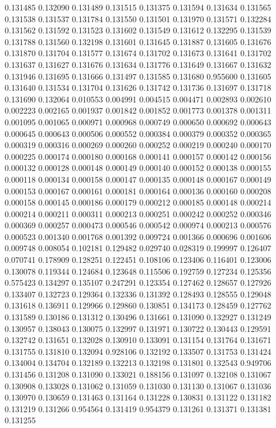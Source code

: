 0.131485
0.132090
0.131489
0.131515
0.131375
0.131594
0.131634
0.131565
0.131538
0.131537
0.131784
0.131550
0.131501
0.131970
0.131571
0.132284
0.131562
0.131592
0.131523
0.131602
0.131549
0.131612
0.132295
0.131539
0.131788
0.131560
0.132198
0.131601
0.131645
0.131887
0.131605
0.131676
0.131870
0.131704
0.131577
0.131674
0.131702
0.131673
0.131641
0.131702
0.131637
0.131627
0.131676
0.131634
0.131776
0.131649
0.131667
0.131632
0.131946
0.131695
0.131666
0.131497
0.131585
0.131680
0.955600
0.131605
0.131640
0.131534
0.131704
0.131626
0.131742
0.131736
0.131697
0.131718
0.131690
0.132064
0.010553
0.004991
0.004515
0.004471
0.002893
0.002610
0.002223
0.002165
0.001937
0.001842
0.001852
0.001773
0.001378
0.001311
0.001095
0.001065
0.000971
0.000968
0.000749
0.000650
0.000692
0.000643
0.000645
0.000643
0.000506
0.000552
0.000384
0.000379
0.000352
0.000365
0.000319
0.000316
0.000269
0.000260
0.000252
0.000219
0.000240
0.000170
0.000225
0.000174
0.000180
0.000168
0.000141
0.000157
0.000142
0.000156
0.000132
0.000128
0.000148
0.000149
0.000140
0.000152
0.000138
0.000155
0.000118
0.000134
0.000158
0.000147
0.000135
0.000148
0.000167
0.000149
0.000153
0.000167
0.000161
0.000181
0.000164
0.000136
0.000160
0.000208
0.000158
0.000145
0.000186
0.000179
0.000212
0.000185
0.000148
0.000214
0.000214
0.000211
0.000311
0.000213
0.000251
0.000242
0.000252
0.000346
0.000369
0.000257
0.000473
0.000546
0.000542
0.000974
0.000213
0.000576
0.000523
0.001340
0.001768
0.001392
0.009724
0.001366
0.000696
0.001606
0.009748
0.008054
0.102181
0.129482
0.029740
0.028319
0.199997
0.126407
0.070741
0.178909
0.128251
0.122451
0.108106
0.123406
0.116401
0.123006
0.130078
0.119344
0.124684
0.123648
0.115506
0.192759
0.127234
0.125356
0.575423
0.134297
0.135107
0.247291
0.123354
0.127462
0.128657
0.127926
0.133407
0.132723
0.129364
0.132336
0.131392
0.128493
0.128555
0.129048
0.131618
0.136911
0.129966
0.129860
0.130851
0.134173
0.128459
0.127762
0.131589
0.130186
0.131312
0.130496
0.131661
0.131090
0.132927
0.131249
0.130957
0.138043
0.130075
0.132997
0.131971
0.130722
0.130443
0.129591
0.132742
0.131651
0.132028
0.130910
0.133091
0.131154
0.131764
0.131671
0.131755
0.131810
0.132094
0.928106
0.132192
0.133507
0.131753
0.131424
0.134004
0.134704
0.132189
0.132213
0.132198
0.131801
0.132543
0.949706
0.131456
0.131208
0.131090
0.133021
0.188156
0.131097
0.132108
0.131067
0.130908
0.133028
0.131062
0.131059
0.131030
0.131130
0.131067
0.131036
0.130970
0.130659
0.131463
0.131164
0.131228
0.130831
0.131122
0.131182
0.131219
0.131266
0.954564
0.131419
0.954379
0.131261
0.131371
0.131381
0.131255
